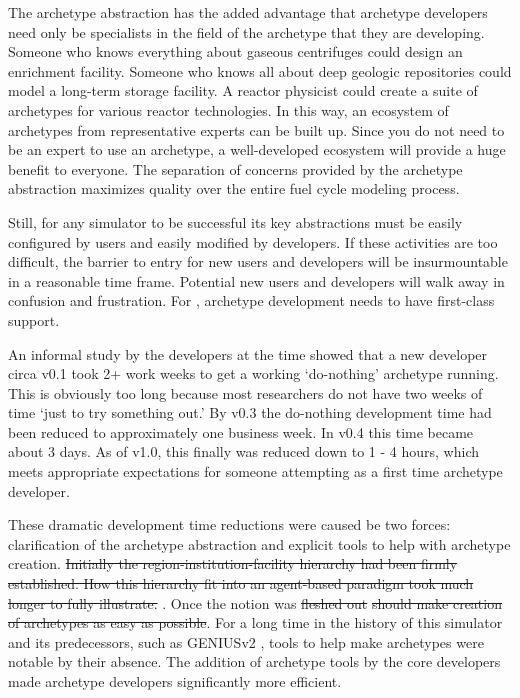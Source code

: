 The archetype abstraction has the added advantage that archetype developers 
need only be specialists in the field of the archetype that they are developing.
Someone who knows everything about gaseous centrifuges could design 
an enrichment facility. Someone who knows all about deep geologic repositories
could model a long-term storage facility. A reactor physicist could create 
a suite of archetypes for various reactor technologies. In this way, an ecosystem 
of archetypes from representative experts can be built up. Since you do not need
to be an expert to use an archetype, a well-developed ecosystem will provide 
a huge benefit to everyone. The separation of concerns provided by the archetype 
abstraction maximizes quality over the entire fuel cycle modeling process.

Still, for any simulator to be successful its key abstractions must be easily 
configured by users and easily modified by developers.  If these activities are 
too difficult, the barrier to entry for new users and developers will be 
insurmountable in a reasonable time frame. Potential new users and developers will 
walk away in confusion and frustration. For \cyclus, archetype development
needs to have first-class support.

An informal study 
by the developers at the time showed that a new developer circa \cyclus v0.1
took 2+ work weeks to get a working `do-nothing' archetype running. This is obviously 
too long because most researchers do not have two weeks of time `just to try 
something out.' By \cyclus v0.3 the do-nothing development time had been reduced 
to approximately one business week. In \cyclus v0.4 this time became about 3 days.
As of \cyclus v1.0, this finally was reduced down to 1 - 4 hours, which meets
appropriate expectations for someone attempting \cyclus as a first time archetype 
developer.

These dramatic development time reductions were caused be two forces:
clarification of the archetype abstraction and explicit tools to help with 
archetype creation. \sout{Initially the region-institution-facility hierarchy 
had been firmly established. How this hierarchy fit into an agent-based 
paradigm took much longer to fully illustrate.} .  Once the notion was \sout{fleshed out} 
\sout{\Cyclus should make creation of archetypes as easy as possible}. 
For a long time in the history of this simulator and its predecessors, such as 
\gls{GENIUSv2} , tools to help make archetypes were notable by their 
absence. 
The addition of archetype tools by the \cyclus core developers made archetype
developers significantly more efficient.

